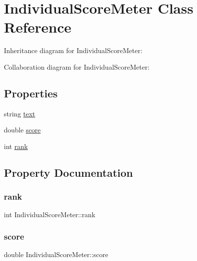\hypertarget{class_individual_score_meter}{}\section{Individual\+Score\+Meter Class Reference}
\label{class_individual_score_meter}


Inheritance diagram for Individual\+Score\+Meter\+:


Collaboration diagram for Individual\+Score\+Meter\+:
\subsection*{Properties}
\begin{DoxyCompactItemize}
\item 
string \hyperlink{class_individual_score_meter_a7a06808ecac8297492f2d5e58f60d400}{text}
\item 
double \hyperlink{class_individual_score_meter_a6694f5c8e57176743dee63910c4cdf60}{score}
\item 
int \hyperlink{class_individual_score_meter_ab53595b3988b48c710cd470756eb092e}{rank}
\end{DoxyCompactItemize}


\subsection{Property Documentation}
\mbox{\label{class_individual_score_meter_ab53595b3988b48c710cd470756eb092e}} 
\subsubsection{\texorpdfstring{rank}{rank}}
{\footnotesize\ttfamily int Individual\+Score\+Meter\+::rank}

\mbox{\label{class_individual_score_meter_a6694f5c8e57176743dee63910c4cdf60}} 
\subsubsection{\texorpdfstring{score}{score}}
{\footnotesize\ttfamily double Individual\+Score\+Meter\+::score}

